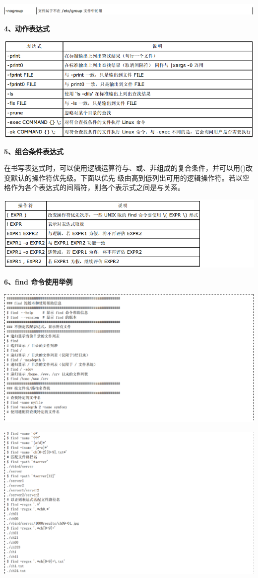 \documentclass[letterpaper,10pt]{sphinxmanual}
\begin{document}
\includegraphics{condition3.png}

\textbf{4、动作表达式}

\includegraphics{action.png}

\textbf{5、组合条件表达式}

在书写表达式时，可以使用逻辑运算符与、或、非组成的复合条件，并可以用()改变默认的操作符优先级。下面以优先
级由高到低列出可用的逻辑操作符。若以空格作为各个表达式的间隔符，则各个表示式之间是与关系。

\includegraphics{combine.png}

\textbf{6、find 命令使用举例}

\includegraphics{eg1.png}

\includegraphics{eg2.png}
\end{document}
